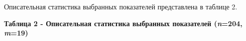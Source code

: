 Описательная статистика выбранных показателей представлена в таблице 2.

{\bfseries Таблица 2 - Описательная статистика выбранных показателей
(\emph{n}=204, \emph{m}=19)}

